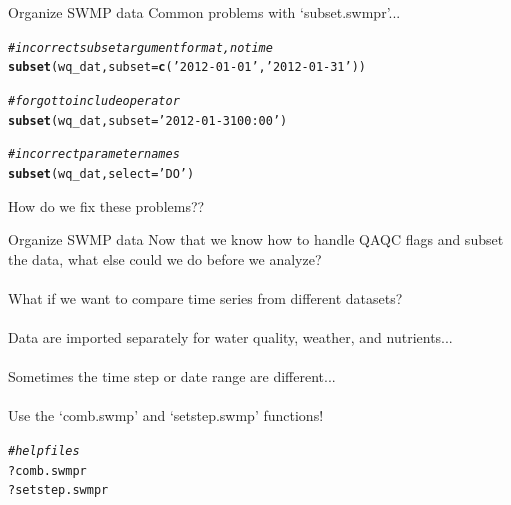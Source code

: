 \documentclass[xcolor=svgnames]{beamer}\usepackage[]{graphicx}\usepackage[]{color}
\makeatletter
\newcommand{\hlstr}[1]{\textcolor[rgb]{0.192,0.494,0.8}{#1}}%
\newcommand{\hlcom}[1]{\textcolor[rgb]{0.678,0.584,0.686}{\textit{#1}}}%
\newcommand{\hlopt}[1]{\textcolor[rgb]{0,0,0}{#1}}%
\newcommand{\hlstd}[1]{\textcolor[rgb]{0.345,0.345,0.345}{#1}}%
\newcommand{\hlkwc}[1]{\textcolor[rgb]{0.333,0.667,0.333}{#1}}%
\newcommand{\hlkwd}[1]{\textcolor[rgb]{0.737,0.353,0.396}{\textbf{#1}}}%
\newenvironment{kframe}{%
 \def\at@end@of@kframe{}%
 \ifinner\ifhmode%
  \def\at@end@of@kframe{\end{minipage}}%
  \begin{minipage}{\columnwidth}%
 \fi\fi%
 \def\FrameCommand##1{\hskip\@totalleftmargin \hskip-\fboxsep
 \colorbox{shadecolor}{##1}\hskip-\fboxsep
     \hskip-\linewidth \hskip-\@totalleftmargin \hskip\columnwidth}%
 \MakeFramed {\advance\hsize-\width
   \@totalleftmargin\z@ \linewidth\hsize
   \@setminipage}}%
 {\par\unskip\endMakeFramed%
 \at@end@of@kframe}
\newenvironment{knitrout}{}{} %
\makeatother
\begin{document}
\begin{frame}[containsverbatim]{Organize SWMP data}
Common problems with `subset.swmpr'...
\begin{knitrout}\scriptsize
{}\color{fgcolor}\begin{kframe}
\begin{alltt}
\hlcom{# incorrect subset argument format, no time}
\hlkwd{subset}\hlstd{(wq_dat,} \hlkwc{subset} \hlstd{=} \hlkwd{c}\hlstd{(}\hlstr{'2012-01-01'}\hlstd{,} \hlstr{'2012-01-31'}\hlstd{))}
\end{alltt}


{\ttfamily\noindent\bfseries\color{errorcolor}{\#\# Error: subset must be of format \%Y-\%m-\%d \%H:\%M}}\begin{alltt}
\hlcom{# forgot to include operator}
\hlkwd{subset}\hlstd{(wq_dat,} \hlkwc{subset} \hlstd{=} \hlstr{'2012-01-31 00:00'}\hlstd{)}
\end{alltt}


{\ttfamily\noindent\bfseries\color{errorcolor}{\#\# Error: Binary operator must be included if only one subset value is provided}}\begin{alltt}
\hlcom{# incorrect parameter names}
\hlkwd{subset}\hlstd{(wq_dat,} \hlkwc{select} \hlstd{=} \hlstr{'DO'}\hlstd{)}
\end{alltt}


{\ttfamily\noindent\bfseries\color{errorcolor}{\#\# Error: select argument is invalid}}\end{kframe}
\end{knitrout}
How do we fix these problems??
\end{frame}

\begin{frame}[containsverbatim]{Organize SWMP data}
Now that we know how to handle QAQC flags and subset the data, what else could we do before we analyze? \\~\\
What if we want to compare time series from different datasets? \\~\\
Data are imported separately for water quality, weather, and nutrients... \\~\\
Sometimes the time step or date range are different...\\~\\
Use the `comb.swmp' and `setstep.swmp' functions!
\begin{knitrout}\scriptsize
{}\color{fgcolor}\begin{kframe}
\begin{alltt}
\hlcom{# help files}
\hlopt{?}\hlstd{comb.swmpr}
\hlopt{?}\hlstd{setstep.swmpr}
\end{alltt}
\end{kframe}
\end{knitrout}
\end{frame}
\end{document}
